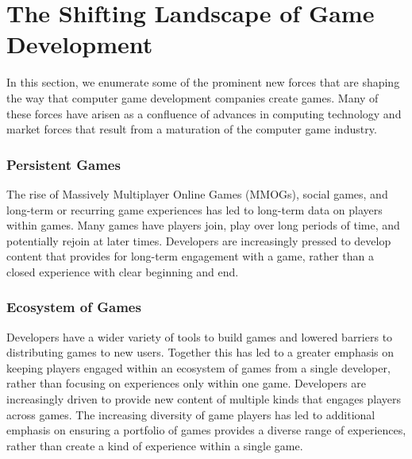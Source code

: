 \documentclass[conference]{IEEEtran}
\begin{document}

\section{The Shifting Landscape of Game Development}

In this section, we enumerate some of the prominent new forces that are shaping the way that computer game development companies create games. Many of these forces have arisen as a confluence of advances in computing technology and market forces that result from a maturation of the computer game industry.

\subsubsection{Persistent Games} 
The rise of Massively Multiplayer Online Games (MMOGs), social games, and long-term or recurring game experiences has led to long-term data on players within games. Many games have players join, play over long periods of time, and potentially rejoin at later times. Developers are increasingly pressed to develop content that provides for long-term engagement with a game, rather than a closed experience with clear beginning and end.

\subsubsection{Ecosystem of Games}
Developers have a wider variety of tools to build games and lowered barriers to distributing games to new users. Together this has led to a greater emphasis on keeping players engaged within an ecosystem of games from a single developer, rather than focusing on experiences only within one game. Developers are increasingly driven to provide new content of multiple kinds that engages players across games. The increasing diversity of game players has led to additional emphasis on ensuring a portfolio of games provides a diverse range of experiences, rather than create a kind of experience within a single game.

\end{document}
